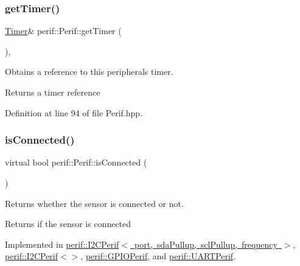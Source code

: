 \subsubsection{\texorpdfstring{getTimer()}{getTimer()}}
{\footnotesize\ttfamily \mbox{\hyperlink{classTimer}{Timer}}\& perif\+::\+Perif\+::get\+Timer (\begin{DoxyParamCaption}{ }\end{DoxyParamCaption})\hspace{0.3cm}{\ttfamily [inline]}, {\ttfamily [protected]}}

Obtains a reference to this peripheral\textquotesingle{}s timer.

\begin{DoxyReturn}{Returns}
a timer reference 
\end{DoxyReturn}


Definition at line 94 of file Perif.\+hpp.


\begin{DoxyCode}{0}

\end{DoxyCode}
\mbox{\label{classperif_1_1Perif_ab9a17fad04e595f3ac0c78b9d3be4c9e}} 
\subsubsection{\texorpdfstring{isConnected()}{isConnected()}}
{\footnotesize\ttfamily virtual bool perif\+::\+Perif\+::is\+Connected (\begin{DoxyParamCaption}{ }\end{DoxyParamCaption})\hspace{0.3cm}{\ttfamily [pure virtual]}}

Returns whether the sensor is connected or not.

\begin{DoxyReturn}{Returns}
if the sensor is connected 
\end{DoxyReturn}


Implemented in \mbox{\hyperlink{classperif_1_1I2CPerif_aa8741297b2f5f9a0242806afa26b7361}{perif\+::\+I2\+C\+Perif$<$ port, sda\+Pullup, scl\+Pullup, frequency $>$}}, \mbox{\hyperlink{classperif_1_1I2CPerif_aa8741297b2f5f9a0242806afa26b7361}{perif\+::\+I2\+C\+Perif$<$$>$}}, \mbox{\hyperlink{classperif_1_1GPIOPerif_ae7c93b409fd4d4d49f9f8eddae612b3e}{perif\+::\+G\+P\+I\+O\+Perif}}, and \mbox{\hyperlink{classperif_1_1UARTPerif_a14c1fdcd81cd9a5eac9d4c0ac9863b66}{perif\+::\+U\+A\+R\+T\+Perif}}.

